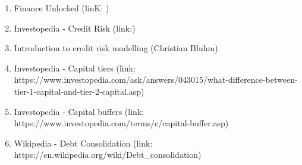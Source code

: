 \documentclass[a4paper,12pt]{article}
\begin{document}
    \begin{enumerate}
        \item Finance Unlocked (linK: )
        \item Investopedia - Credit Risk (link:)
        \item Introduction to credit risk modelling (Christian Bluhm)
        \item Investopedia - Capital tiers (link: https://www.investopedia.com/ask/answers/043015/what-difference-between-tier-1-capital-and-tier-2-capital.asp)
        \item Investopedia - Capital buffers (link: https://www.investopedia.com/terms/c/capital-buffer.asp)
        \item Wikipedia - Debt Consolidation (link: https://en.wikipedia.org/wiki/Debt_consolidation)
    \end{enumerate}
\end{document}
